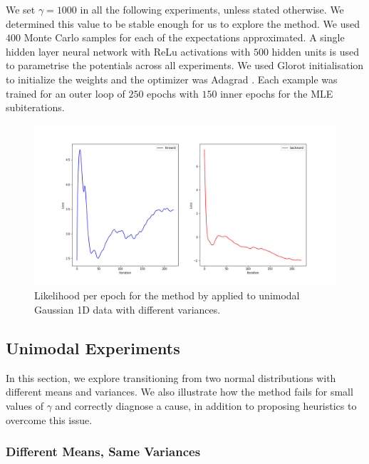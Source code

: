 \documentclass[a4paper,12pt,twoside,openright]{report}
\theoremstyle{definition}
\begin{document}
We set $\gamma=1000$ in all the following experiments, unless stated otherwise. We determined this value to be stable enough for us to explore the method. We used $400$ Monte Carlo  samples for each of the expectations approximated. A single hidden layer neural network \citep{lecun2015deep} with ReLu activations \citep{glorot2011deep} with $500$ hidden units is used to parametrise the potentials across all experiments. We used Glorot initialisation \citep{glorot2010understanding} to initialize the weights and the optimizer was Adagrad \citep{duchi2011adaptive}.  Each example was trained for an outer loop of $250$ epochs with $150$ inner epochs for the MLE subiterations. 
\begin{figure}
    \centering
    \includegraphics[scale=0.4,trim={2.3cm 1cm 2.5cm 0}, clip]{images/Pavon/pavon convergence big var.png} \vspace{-0.6cm}
    \caption{Likelihood per epoch for the method by \cite{pavon2018data} applied to unimodal Gaussian 1D data with different variances. }
    \label{fig:small_to_big_convergence}
\end{figure}
\subsection{Unimodal Experiments}

In this section, we explore transitioning from two normal distributions with different means and variances. We also illustrate how the method fails for small values of $\gamma$ and correctly diagnose a cause, in addition to proposing heuristics to overcome this issue. 

\subsubsection{Different Means, Same Variances}
\end{document}

